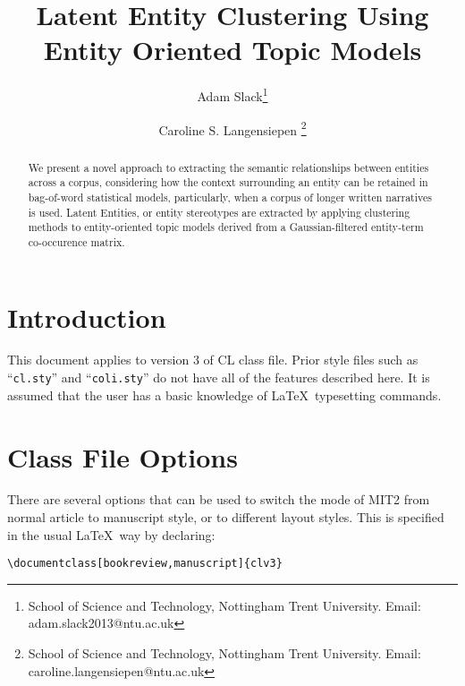 \documentclass{clv3}
\begin{document}
\title{Latent Entity Clustering Using Entity Oriented Topic Models}

\author{Adam Slack\thanks{School of Science and Technology, Nottingham Trent University. Email: adam.slack2013@ntu.ac.uk}}

\author{Caroline S. Langensiepen \thanks{School of Science and Technology, Nottingham Trent University. Email: caroline.langensiepen@ntu.ac.uk}}


\maketitle

\begin{abstract}
  We present a novel approach to extracting the semantic relationships between entities across a
  corpus, considering how the context surrounding an entity can be retained in bag-of-word statistical
  models, particularly, when a corpus of longer written narratives is used. Latent Entities, or
  entity stereotypes are extracted by applying clustering methods to entity-oriented topic models
  derived from a Gaussian-filtered entity-term co-occurence matrix.
\end{abstract}

\section{Introduction}

This document applies to version 3 of CL class file. Prior style files such as 
``{\tt cl.sty}'' and ``{\tt coli.sty}'' do not have all of the features 
described here. It is assumed that the user has a basic knowledge of \LaTeX\ 
typesetting commands.

\section{Class File Options}

There are several options that can be used to switch the mode of MIT2 from normal 
article to manuscript style, or to different layout styles. This is specified in 
the usual \LaTeX\ way by declaring:

\verb|\documentclass[bookreview,manuscript]{clv3}|

\end{document}
